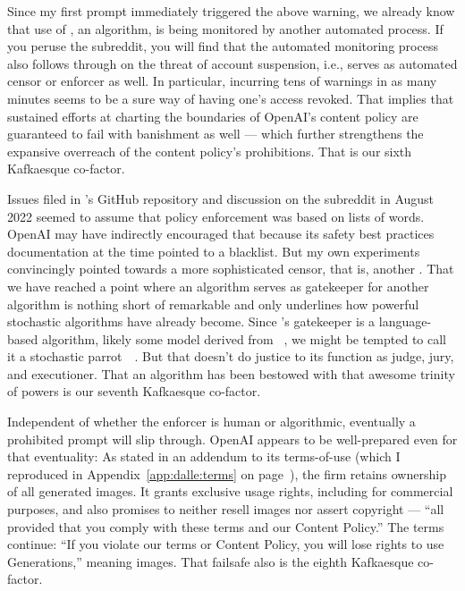 Since my first prompt immediately triggered the above warning, we already know
that use of \DALLE, an algorithm, is being monitored by another automated
process. If you peruse the \DALLE{} subreddit, you will find that the automated
monitoring process also follows through on the threat of account suspension,
i.e., serves as automated censor or enforcer as well. In particular, incurring
tens of warnings in as many minutes seems to be a sure way of having one's
access revoked. That implies that sustained efforts at charting the boundaries
of OpenAI's content policy are guaranteed to fail with banishment as well —
which further strengthens the expansive overreach of the content policy's
prohibitions. That is our sixth Kafkaesque co-factor.

Issues filed in \DALLE's GitHub repository and discussion on the subreddit in
August 2022 seemed to assume that policy enforcement was based on lists of
words. OpenAI may have indirectly encouraged that because its safety best
practices documentation at the time pointed to a  blacklist. But my own
experiments convincingly pointed towards a more sophisticated censor, that is,
another \AI. That we have reached a point where an algorithm serves as
gatekeeper for another algorithm is nothing short of remarkable and only
underlines how powerful stochastic algorithms have already become. Since
\DALLE's gatekeeper is a language-based algorithm, likely some model derived
from \GPT~\cite{BrownMannea2020}, we might be tempted to call it a stochastic
parrot~~\cite{BenderGebruea2021}. But that doesn't do justice to
its function as judge, jury, and executioner. That an algorithm has been
bestowed with that awesome trinity of powers is our seventh Kafkaesque
co-factor.

Independent of whether the enforcer is human or algorithmic, eventually a
prohibited prompt will slip through. OpenAI appears to be well-prepared even for
that eventuality: As stated in an addendum to its terms-of-use (which I
reproduced in Appendix~\ref{app:dalle:terms} on
page~\pageref{app:dalle:terms}), the firm retains ownership of all generated
images. It grants exclusive usage rights, including for commercial purposes, and
also promises to neither resell images nor assert copyright — ``all provided
that you comply with these terms and our Content Policy.'' The terms continue:
``If you violate our terms or Content Policy, you will lose rights to use
Generations,'' meaning images. That failsafe also is the eighth Kafkaesque
co-factor.

